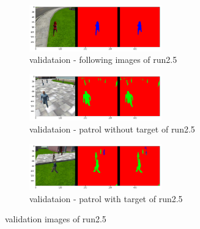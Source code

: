 \documentclass[paper=a4, fontsize=11pt]{scrartcl} %
\numberwithin{equation}{section} %
\numberwithin{figure}{section} %
\numberwithin{table}{section} %
\begin{document}
 \begin{figure}[ht]
	\begin{subfigure}{0.33\textwidth}
	\includegraphics[width=0.9\linewidth, height=2cm]{./imgs/following_images25.png} 
	\caption{validataion - following images of run2.5}
	\label{fig:subfollowing_images25}
	\end{subfigure}
	\begin{subfigure}{0.33\textwidth}
	\includegraphics[width=0.9\linewidth, height=2cm]{./imgs/patrol_non_targ25.png}
	\caption{validataion - patrol without target of run2.5}
	\label{fig:subpatrol_non_targ25}
	\end{subfigure}
	\begin{subfigure}{0.33\textwidth}
	\includegraphics[width=0.9\linewidth, height=2cm]{./imgs/patrol_with_targ25.png}
	\caption{validataion - patrol with target of run2.5}
	\label{fig:subpatrol_with_targ25}
	\end{subfigure}

	\caption{validation images of run2.5}
	\label{fig:outputimages25}
\end{figure}
\end{document}

